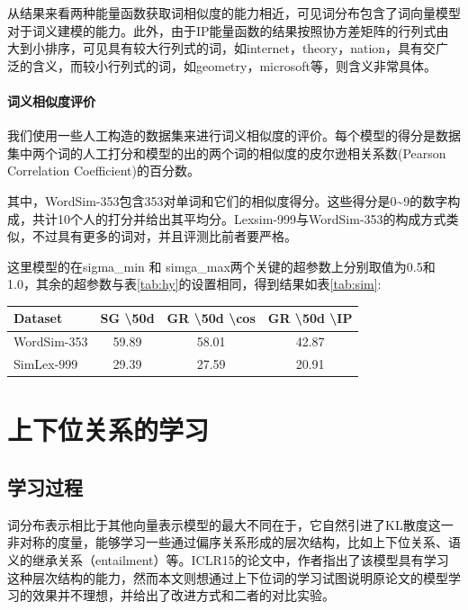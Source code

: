 \documentclass[a4paper,13pt]{article}
\begin{document}
\begin{spacing}{1.5}
\begin{center}
\end{center}
从结果来看两种能量函数获取词相似度的能力相近，可见词分布包含了词向量模型对于词义建模的能力。此外，由于IP能量函数的结果按照协方差矩阵的行列式由大到小排序，可见具有较大行列式的词，如internet，theory，nation，具有交广泛的含义，而较小行列式的词，如geometry，microsoft等，则含义非常具体。

\paragraph{词义相似度评价}
我们使用一些人工构造的数据集来进行词义相似度的评价。每个模型的得分是数据集中两个词的人工打分和模型的出的两个词的相似度的皮尔逊相关系数(Pearson Correlation Coefficient)的百分数。

其中，WordSim-353包含353对单词和它们的相似度得分。这些得分是0\~{}9的数字构成，共计10个人的打分并给出其平均分。Lexsim-999与WordSim-353的构成方式类似，不过具有更多的词对，并且评测比前者要严格。

这里模型的在sigma\_min 和 simga\_max两个关键的超参数上分别取值为0.5和1.0，其余的超参数与表\ref{tab:hy}的设置相同，得到结果如表\ref{tab:sim}:

\begin{center}
\begin{tabular}{| l | c | c | c |}
\hline
\textbf{Dataset} & \textbf{SG \textbackslash 50d} & \textbf{GR \textbackslash 50d \textbackslash cos} & \textbf{GR \textbackslash 50d \textbackslash IP} \\
\hline
WordSim-353 & 59.89 & 58.01 & 42.87 \\
\hline
SimLex-999 & 29.39 & 27.59 & 20.91 \\
\hline
\end{tabular}
\label{tab:sim}
\end{center}

\section{上下位关系的学习}

\subsection{学习过程}

词分布表示相比于其他向量表示模型的最大不同在于，它自然引进了KL散度这一非对称的度量，能够学习一些通过偏序关系形成的层次结构，比如上下位关系、语义的继承关系（entailment）等。ICLR15的论文中，作者指出了该模型具有学习这种层次结构的能力，然而本文则想通过上下位词的学习试图说明原论文的模型学习的效果并不理想，并给出了改进方式和二者的对比实验。


\end{spacing}
\end{document}
